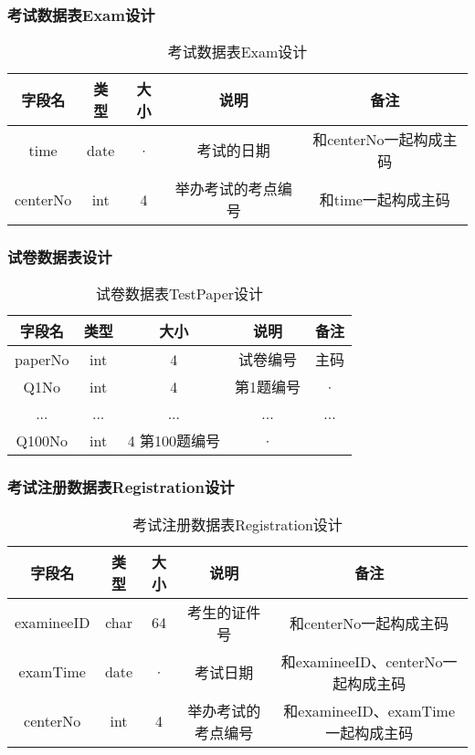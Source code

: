 \subsubsection{考试数据表Exam设计}
\begin{table}[htbp]
\centering
\caption{考试数据表Exam设计} \label{tab:order-database}
\begin{tabular}{|c|c|c|c|c|}
    \hline
    字段名 & 类型 & 大小 & 说明 & 备注 \\
    \hline
    time & date & · & 考试的日期 & 和centerNo一起构成主码 \\
    \hline
    centerNo & int & 4 & 举办考试的考点编号 & 和time一起构成主码 \\
    \hline
\end{tabular}
\end{table}

\subsubsection{试卷数据表设计}
\begin{table}[htbp]
\centering
\caption{试卷数据表TestPaper设计} \label{tab:order-database}
\begin{tabular}{|c|c|c|c|c|}
    \hline
    字段名 & 类型 & 大小 & 说明 & 备注 \\
    \hline
    paperNo & int & 4 & 试卷编号 & 主码 \\
    \hline
    Q1No & int & 4 & 第1题编号 & · \\
    \hline
    ... & ... & ... & ... & ... \\
    \hline
    Q100No & int & 4 第100题编号 & · \\
    \hline
\end{tabular}
\end{table}

\subsubsection{考试注册数据表Registration设计}
\begin{table}[htbp]
\centering
\caption{考试注册数据表Registration设计} \label{tab:order-database}
\begin{tabular}{|c|c|c|c|c|}
    \hline
    字段名 & 类型 & 大小 & 说明 & 备注 \\
    \hline
    examineeID & char & 64 & 考生的证件号 & 和centerNo一起构成主码 \\
    \hline
    examTime & date & · & 考试日期 & 和examineeID、centerNo一起构成主码 \\
    \hline
    centerNo & int & 4 & 举办考试的考点编号 & 和examineeID、examTime一起构成主码 \\
    \hline
\end{tabular}
\end{table}


